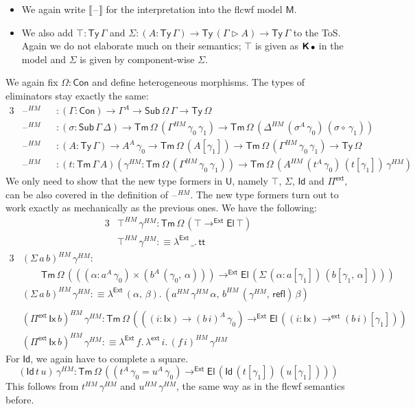 \documentclass[12pt,a4paper,twoside,openany]{book}
\theoremstyle{remark}
\theoremstyle{definition}
\theoremstyle{theorem}
\newcommand{\ms}[1]{\mathsf{#1}}
\newcommand{\bs}[1]{\boldsymbol{#1}}
\newcommand{\refl}{\mathsf{refl}}
\newcommand{\Con}{\mathsf{Con}}
\newcommand{\Sub}{\mathsf{Sub}}
\newcommand{\Tm}{\mathsf{Tm}}
\newcommand{\Ty}{\mathsf{Ty}}
\newcommand{\U}{\mathsf{U}}
\newcommand{\El}{\mathsf{El}}
\newcommand{\Id}{\mathsf{Id}}
\renewcommand{\tt}{\mathsf{tt}}
\newcommand{\blank}{\mathord{\hspace{1pt}\text{--}\hspace{1pt}}}
\newcommand{\ext}{\triangleright}
\newcommand{\toe}{\to^{\ms{Ext}}}
\newcommand{\lambdae}{\lambda^{\ms{Ext}}}
\newcommand{\Piinf}{\Pi^{\mathsf{ext}}}
\newcommand{\toinf}{\to^{\ms{ext}}}
\newcommand{\lambdainf}{\lambda^{\ms{ext}}}
\newcommand{\bemptycon}{\scaleobj{.75}{\bs{\bullet}}}
\newcommand{\bM}{\bs{\mathsf{M}}}
\newcommand{\llb}{\llbracket}
\newcommand{\rrb}{\rrbracket}
\newcommand{\defn}{:\equiv}
\begin{document}
\begin{itemize}
  \item
  We again write $\llb\blank\rrb$ for the interpretation into the flcwf model $\bM$.
  \item
  We also add $\top : \Ty\,\Gamma$ and $\Sigma : (A : \Ty\,\Gamma) \to
  \Ty\,(\Gamma \ext A) \to \Ty\,\Gamma$ to the ToS. Again we do not elaborate
  much on their semantics; $\top$ is given as ${\bs{\ms{K}}\,\bemptycon}$ in
  the model and $\Sigma$ is given by component-wise $\Sigma$.
\end{itemize}
We again fix $\Omega : \Con$ and define heterogeneous morphisms. The types of
eliminators stay exactly the same:
\begin{alignat*}{3}
  &\blank^{HM} &&: (\Gamma : \Con) \to \Gamma^A \to \Sub\,\Omega\,\Gamma \to \Ty\,\Omega\\
  &\blank^{HM} &&: (\sigma : \Sub\,\Gamma\,\Delta) \to \Tm\,\Omega\,(\Gamma^{HM}\,\gamma_0\,\gamma_1) \to \Tm\,\Omega\,(\Delta^{HM}\,(\sigma^A\,\gamma_0)\,(\sigma \circ\,\gamma_1))\\
  &\blank^{HM} &&: (A : \Ty\,\Gamma) \to A^A\,\gamma_0 \to \Tm\,\Omega\,(A[\gamma_1])
  \to \Tm\,\Omega\,(\Gamma^{HM}\,\gamma_0\,\gamma_1) \to \Ty\,\Omega\\
  &\blank^{HM} &&: (t : \Tm\,\Gamma\,A)(\gamma^{HM} : \Tm\,\Omega\,(\Gamma^{HM}\,\gamma_0\,\gamma_1))
   \to \Tm\,\Omega\,(A^{HM}\,(t^A\,\gamma_0)\,(t[\gamma_1])\,\gamma^{HM})
\end{alignat*}
We only need to show that the new type formers in $\U$, namely $\top$, $\Sigma$,
$\Id$ and $\Piinf$, can be also covered in the definition of $\blank^{HM}$. The
new type formers turn out to work exactly as mechanically as the previous
ones. We have the following:
\begin{alignat*}{3}
  & \top^{HM}\,\gamma^{HM} : \Tm\,\Omega\,(\top \toe \El\,\top)\\
  & \top^{HM}\,\gamma^{HM} \defn \lambdae\,\_.\,\tt
\end{alignat*}
\begin{alignat*}{3}
  & (\Sigma\,a\,b)^{HM}\,\gamma^{HM} : \\
  & \hspace{2em} \Tm\,\Omega\,(((\alpha : a^A\,\gamma_0) \times (b^A\,(\gamma_0,\,\alpha))) \toe \El\,(\Sigma\,(\alpha : a[\gamma_1])\,(b[\gamma_1,\,\alpha])))\\
  & (\Sigma\,a\,b)^{HM}\,\gamma^{HM} \defn \lambdae\,(\alpha,\,\beta).\,(a^{HM}\,\gamma^{HM}\,\alpha,\,b^{HM}\,(\gamma^{HM},\,\refl)\,\beta)\\
  & \\
  & (\Piinf\,\ms{Ix}\,b)^{HM}\,\gamma^{HM} : \Tm\,\Omega\,(((i : \ms{Ix}) \to (b\,i)^A\,\gamma_0) \toe \El\,((i : \ms{Ix}) \toinf (b\,i)[\gamma_1]))\\
  & (\Piinf\,\ms{Ix}\,b)^{HM}\,\gamma^{HM} \defn \lambdae\,f.\,\lambdainf\,i.\,(f\,i)^{HM}\,\gamma^{HM}
\end{alignat*}
For $\Id$, we again have to complete a square.
\[
(\Id\,t\,u)\,\gamma^{HM} : \Tm\,\Omega\,((t^A\,\gamma_0 = u^A\,\gamma_0) \toe \El\,(\Id\,(t[\gamma_1])\,(u[\gamma_1])))
\]
This follows from $t^{HM}\,\gamma^{HM}$ and $u^{HM}\,\gamma^{HM}$, the same way
as in the flcwf semantics before.
\end{document}
